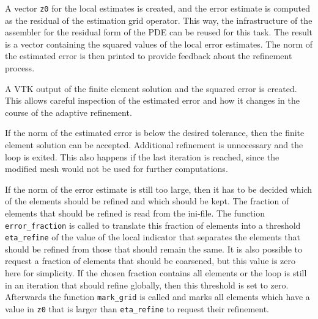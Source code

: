 \documentclass[a4paper,12pt]{article}
\begin{document}

A vector \lstinline {z0} for the local estimates is created, and the error estimate is
computed as the residual of the estimation grid operator. This way, the infrastructure of
the assembler for the residual form of the PDE can be reused for this task. The result is
a vector containing the squared values of the local error estimates. The norm of the
estimated error is then printed to provide feedback about the refinement process.


A VTK output of the finite element solution and the squared error is created. This allows
careful inspection of the estimated error and how it changes in the course of the
adaptive refinement.


If the norm of the estimated error is below the desired tolerance, then the finite element
solution can be accepted. Additional refinement is unnecessary and the loop is exited. This
also happens if the last iteration is reached, since the modified mesh would not be
used for further computations.


If the norm of the error estimate is still too large, then it has to be decided which of the
elements should be refined and which should be kept. The fraction of elements that should be
refined is read from the ini-file. The function \lstinline{error_fraction} is called to
translate this fraction of elements into a threshold \lstinline{eta_refine} of the value of
the local indicator that separates the elements that should be refined from those that should
remain the same. It is also possible to request a fraction of elements that should be
coarsened, but this value is zero here for simplicity. If the chosen fraction contains all
elements or the loop is still in an iteration that should refine globally, then this
threshold is set to zero. Afterwards the function \lstinline{mark_grid} is called and marks
all elements which have a value in \lstinline{z0} that is larger than \lstinline{eta_refine}
to request their refinement.
\end{document}
